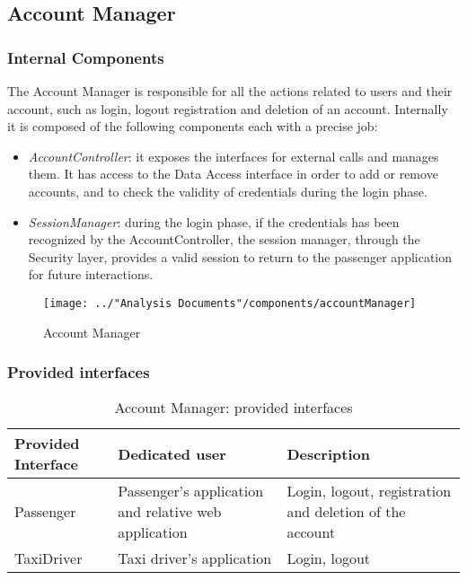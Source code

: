 \subsection{Account Manager}\label{comp:accountManager}
\subsubsection{Internal Components}
The Account Manager is responsible for all the actions related to users and their account, such as login, logout registration and deletion of an account. Internally it is composed of the following components each with a precise job:
\begin{itemize}
	\item \textit{AccountController}: it exposes the interfaces for external calls and manages them. It has access to the Data Access interface in order to add or remove accounts, and to check the validity of credentials during the login phase.
	\item \textit{SessionManager}: during the login phase, if the credentials has been recognized by the AccountController, the session manager, through the Security layer, provides a valid session to return to the passenger application for future interactions.
\end{itemize}
\begin{figure}[H]
	\centering
	\texttt{[image: ../"Analysis Documents"/components/accountManager]}
	\label{fig:accountManager}
	\caption{Account Manager}
\end{figure}
\subsubsection{Provided interfaces}
\begin{table}[H]
\begin{longtable}{| p{} | p{} | p{} |}
\hline
 \textbf{Provided Interface} & \textbf{Dedicated user} & \textbf{Description} \\ \hline
Passenger & Passenger's application and relative web application & Login, logout, registration and deletion of the account \\ \hline
TaxiDriver & Taxi driver's application & Login, logout \\ \hline
\end{longtable}
\caption{Account Manager: provided interfaces}
\label{tab:accountManager:providedInterfaces}
\end{table}
